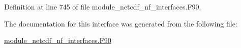 Definition at line 745 of file module\+\_\+netcdf\+\_\+nf\+\_\+interfaces.\+F90.



The documentation for this interface was generated from the following file\+:\begin{DoxyCompactItemize}
\item 
\hyperlink{module__netcdf__nf__interfaces_8F90}{module\+\_\+netcdf\+\_\+nf\+\_\+interfaces.\+F90}\end{DoxyCompactItemize}
